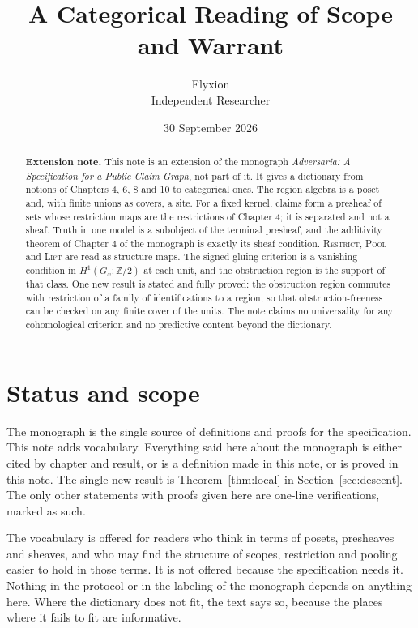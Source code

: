 \documentclass[11pt]{article}
\title{A Categorical Reading of Scope and Warrant}
\author{Flyxion\\\small Independent Researcher}
\date{30 September 2026}
\theoremstyle{plain}
\theoremstyle{definition}
\theoremstyle{remark}
\newcommand{\Zt}{\mathbb{Z}/2}
\begin{document}
\maketitle

\begin{abstract}
\noindent
\textbf{Extension note.} This note is an extension of the monograph \emph{Adversaria: A Specification for a Public Claim Graph}, not part of it. It gives a dictionary from notions of Chapters 4, 6, 8 and 10 to categorical ones. The region algebra is a poset and, with finite unions as covers, a site. For a fixed kernel, claims form a presheaf of sets whose restriction maps are the restrictions of Chapter 4; it is separated and not a sheaf. Truth in one model is a subobject of the terminal presheaf, and the additivity theorem of Chapter 4 of the monograph is exactly its sheaf condition. \textsc{Restrict}, \textsc{Pool} and \textsc{Lift} are read as structure maps. The signed gluing criterion is a vanishing condition in $H^1(G_x;\Zt)$ at each unit, and the obstruction region is the support of that class. One new result is stated and fully proved: the obstruction region commutes with restriction of a family of identifications to a region, so that obstruction-freeness can be checked on any finite cover of the units. The note claims no universality for any cohomological criterion and no predictive content beyond the dictionary.
\end{abstract}

\section{Status and scope}

The monograph is the single source of definitions and proofs for the specification. This note adds vocabulary. Everything said here about the monograph is either cited by chapter and result, or is a definition made in this note, or is proved in this note. The single new result is Theorem~\ref{thm:local} in Section~\ref{sec:descent}. The only other statements with proofs given here are one-line verifications, marked as such.

The vocabulary is offered for readers who think in terms of posets, presheaves and sheaves, and who may find the structure of scopes, restriction and pooling easier to hold in those terms. It is not offered because the specification needs it. Nothing in the protocol or in the labeling of the monograph depends on anything here. Where the dictionary does not fit, the text says so, because the places where it fails to fit are informative.
\end{document}
